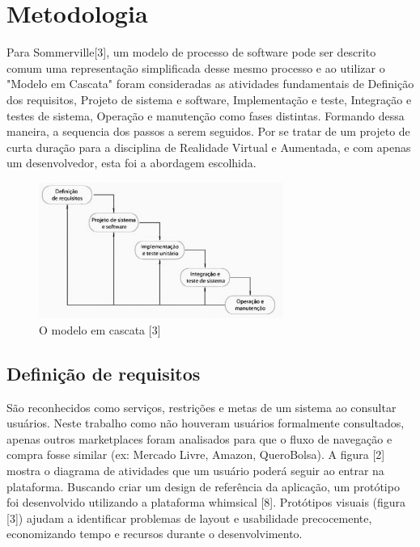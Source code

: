 \documentclass[conference]{IEEEtran}
\begin{document}
\section{Metodologia}
Para Sommerville[3], um modelo de processo de software pode ser descrito comum
uma representação simplificada desse mesmo processo e ao utilizar o "Modelo em
Cascata" foram consideradas as atividades fundamentais de Definição dos
requisitos, Projeto de sistema e software, Implementação e teste, Integração e
testes de sistema, Operação e manutenção como fases distintas. Formando dessa
maneira, a sequencia dos passos a serem seguidos. Por se tratar de um projeto
de curta duração para a disciplina de Realidade Virtual e Aumentada, e com
apenas um desenvolvedor, esta foi a abordagem escolhida.

\begin{figure}[h]
  \caption{O modelo em cascata [3]}

  \centering %
  \includegraphics[width=8cm]{assets/modelo_cascata.png}
\end{figure}

\subsection{Definição de requisitos}\label{AA}
São reconhecidos como serviços, restrições e metas de um sistema ao consultar
usuários. Neste trabalho como não houveram usuários formalmente consultados,
apenas outros marketplaces foram analisados para que o fluxo de navegação e
compra fosse similar (ex: Mercado Livre, Amazon, QueroBolsa). A figura [2]
mostra o diagrama de atividades que um usuário poderá seguir ao entrar na
plataforma. Buscando criar um design de referência da aplicação, um protótipo
foi desenvolvido utilizando a plataforma whimsical [8]. Protótipos visuais
(figura [3]) ajudam a identificar problemas de layout e usabilidade
precocemente, economizando tempo e recursos durante o desenvolvimento.
\end{document}
